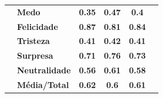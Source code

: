 \begin{table}[]
\begin{tabular}{llcccc}
                                       & \textbf{Medo}         & \textbf{0.35}                         & \textbf{0.47}                          & \textbf{0.4}                          &                                       \\
                                       & \textbf{Felicidade}   & \textbf{0.87}                         & \textbf{0.81}                          & \textbf{0.84}                         &                                       \\
                                       & \textbf{Tristeza}     & \textbf{0.41}                         & \textbf{0.42}                          & \textbf{0.41}                         &                                       \\
                                       & \textbf{Surpresa}     & \textbf{0.71}                         & \textbf{0.76}                          & \textbf{0.73}                         &                                       \\
                                       & \textbf{Neutralidade} & \textbf{0.56}                         & \textbf{0.61}                          & \textbf{0.58}                         &                                       \\
                                       & \textbf{Média/Total}  & \textbf{0.62}                         & \textbf{0.6}                           & \textbf{0.61}                         &                                       \\ \hline
\end{tabular}
\end{table}


